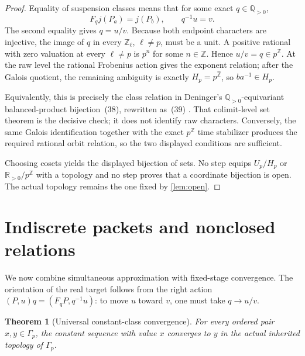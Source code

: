 \documentclass[11pt]{article}
\newtheorem{theorem}{Theorem}[section]
\theoremstyle{definition}
\newcommand{\Q}{\mathbb{Q}}
\newcommand{\R}{\mathbb{R}}
\newcommand{\Z}{\mathbb{Z}}
\newcommand{\Zhat}{\widehat{\mathbb Z}}
\begin{document}
\begin{proof}
Equality of suspension classes means that for some exact \(q\in\Q_{>0}\),
\[
 F_qj(P_a)=j(P_b),\qquad q^{-1}u=v.
\]
The second equality gives \(q=u/v\).  Because both endpoint characters are injective, the image of \(q\) in every \(\Z_\ell\), \(\ell\ne p\), must be a unit.  A positive rational with zero valuation at every \(\ell\ne p\) is \(p^n\) for some \(n\in\Z\).  Hence \(u/v=q\in p^{\Z}\).  At the raw level the rational Frobenius action gives the exponent relation; after the Galois quotient, the remaining ambiguity is exactly \(H_p=p^{\Zhat}\), so \(ba^{-1}\in H_p\).

Equivalently, this is precisely the class relation in Deninger's \(\Q_{>0}\)-equivariant balanced-product bijection~(38), rewritten as~(39) \cite[equations~(38)--(39), physical p.~33]{Deninger2026}.  That colimit-level set theorem is the decisive check; it does not identify raw characters.  Conversely, the same Galois identification together with the exact \(p^{\Z}\) time stabilizer produces the required rational orbit relation, so the two displayed conditions are sufficient.

Choosing cosets yields the displayed bijection of sets.  No step equips \(U_p/H_p\) or \(\R_{>0}/p^{\Z}\) with a topology and no step proves that a coordinate bijection is open.  The actual topology remains the one fixed by \cref{lem:open}.
\end{proof}

\section{Indiscrete packets and nonclosed relations}\label{sec:main}

We now combine simultaneous approximation with fixed-stage convergence.  The orientation of the real target follows from the right action \((P,u)q=(F_qP,q^{-1}u)\): to move \(u\) toward \(v\), one must take \(q\to u/v\).

\begin{theorem}[Universal constant-class convergence]\label{thm:universal}
For every ordered pair \(x,y\in\Gamma_p\), the constant sequence with value \(x\) converges to \(y\) in the actual inherited topology of \(\Gamma_p\).
\end{theorem}
\end{document}
